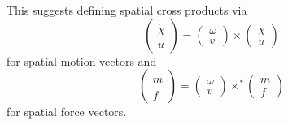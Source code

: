 \documentclass[a4paper]{article}
\begin{document}
This suggests defining spatial cross products via
\begin{equation}
\left(\begin{array}{c}\dot{\chi}\\\dot{u} \end{array}\right) =
\left(\begin{array}{c}\omega\\ v\end{array}\right) \times \left(\begin{array}{c} \chi\\u \end{array}\right)
\end{equation}
for spatial motion vectors and
\begin{equation}
\left(\begin{array}{c}\dot{m}\\\dot{f} \end{array}\right) =
\left(\begin{array}{c}\omega\\ v\end{array}\right) \times^* \left(\begin{array}{c} m\\f \end{array}\right)
\end{equation}
for spatial force vectors.
\end{document}

